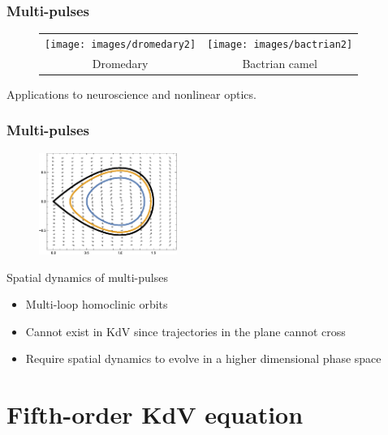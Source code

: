 \documentclass[16pt]{beamer}
\begin{document}
\begin{frame}
\frametitle{Multi-pulses}
\fontsize{16}{7.2}\selectfont
\begin{figure}[H]
\begin{center}
\begin{tabular}{cc}
\texttt{[image: images/dromedary2]} & \texttt{[image: images/bactrian2]} \\
Dromedary & Bactrian camel
\end{tabular}
\end{center}
\end{figure}
Applications to neuroscience and nonlinear optics.
\end{frame}

\begin{frame}
\frametitle{Multi-pulses}
\fontsize{16}{7.2}\selectfont

\begin{figure}[H]
\begin{center}
\includegraphics[width=0.4\textwidth]{images/KdV3phaseportrait.eps}
\end{center}
\end{figure}

Spatial dynamics of multi-pulses
\begin{itemize}
	\item Multi-loop homoclinic orbits
	\vspace{0.25cm}
	\item Cannot exist in KdV since trajectories in the plane cannot cross
	\vspace{0.25cm}
	\item Require spatial dynamics to evolve in a higher dimensional phase space 
\end{itemize}

\end{frame}

\section{Fifth-order KdV equation}
\end{document}
